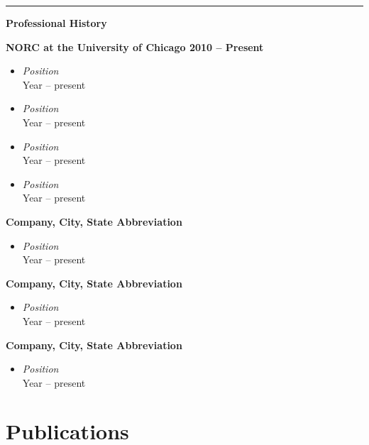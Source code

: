\documentclass[10pt]{article}
\providecommand{\robotoBold}{\bfseries}
\newcommand{\SidebarHeading}[1]{%
    \vspace{14pt}
    {\color{NORCOrange}\rule{0.35in}{2.5pt}}\par
    \vspace{6pt}
    {\fontsize{14}{12}\selectfont
    \color{NORCOrange}\robotoBold{#1}\par}
    \vspace{12pt}
}
\newcommand{\SkillGroup}[2]{%
  {\robotoBold{#1}}\par
  \begin{itemize}[leftmargin=*]
    #2
  \end{itemize}
  \vspace{9pt}
}
\begin{document}
\hfill
\begin{minipage}[t]{0.31\textwidth}
    \SidebarHeading{Professional History}
      \SkillGroup{NORC at the University of Chicago \hfill 2010 -- Present}{
          \item \textit{Position} \\ Year -- present
          \item \textit{Position} \\ Year -- present
          \item \textit{Position} \\ Year -- present
          \item \textit{Position} \\ Year -- present
      }

    
    \SkillGroup{Company, City, State Abbreviation}{
        \item \textit{Position} \\ Year -- present
    }
    
    \SkillGroup{Company, City, State Abbreviation}{
        \item \textit{Position} \\ Year -- present
    }
    
        \SkillGroup{Company, City, State Abbreviation}{
        \item \textit{Position} \\ Year -- present
    }
\end{minipage}

\newpage

\section*{Publications}
\end{document}
